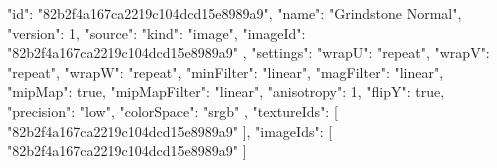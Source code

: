 {
  "id": "82b2f4a167ca2219c104dcd15e8989a9",
  "name": "Grindstone Normal",
  "version": 1,
  "source": {
    "kind": "image",
    "imageId": "82b2f4a167ca2219c104dcd15e8989a9"
  },
  "settings": {
    "wrapU": "repeat",
    "wrapV": "repeat",
    "wrapW": "repeat",
    "minFilter": "linear",
    "magFilter": "linear",
    "mipMap": true,
    "mipMapFilter": "linear",
    "anisotropy": 1,
    "flipY": true,
    "precision": "low",
    "colorSpace": "srgb"
  },
  "textureIds": [
    "82b2f4a167ca2219c104dcd15e8989a9"
  ],
  "imageIds": [
    "82b2f4a167ca2219c104dcd15e8989a9"
  ]
}
